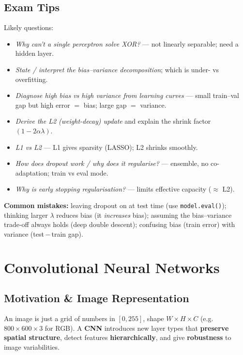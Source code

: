 \documentclass[10pt,a4paper]{article}
\begin{document}
	\subsection{Exam Tips}

	\begin{examtipbox}
		Likely questions:
		\begin{itemize}[leftmargin=*]
			\item \emph{Why can't a single perceptron solve XOR?} --- not linearly separable; need a hidden layer.
			\item \emph{State / interpret the bias--variance decomposition}; which is under- vs overfitting.
			\item \emph{Diagnose high bias vs high variance from learning curves} --- small train--val gap but high error $=$ bias; large gap $=$ variance.
			\item \emph{Derive the L2 (weight-decay) update} and explain the shrink factor $(1-2\alpha\lambda)$.
			\item \emph{L1 vs L2} --- L1 gives sparsity (LASSO); L2 shrinks smoothly.
			\item \emph{How does dropout work / why does it regularise?} --- ensemble, no co-adaptation; train vs eval mode.
			\item \emph{Why is early stopping regularisation?} --- limits effective capacity ($\approx$ L2).
		\end{itemize}
		\textbf{Common mistakes:} leaving dropout on at test time (use \texttt{model.eval()}); thinking larger $\lambda$ reduces bias (it \emph{increases} bias); assuming the bias--variance trade-off always holds (deep double descent); confusing bias (train error) with variance (test\,$-$\,train gap).
	\end{examtipbox}
	
	\section{Convolutional Neural Networks}
	
	\subsection{Motivation \& Image Representation}

	\begin{definitionbox}
		An image is just a grid of numbers in $[0,255]$, shape $W\times H\times C$ (e.g.\ $800\times600\times3$ for RGB). A \textbf{CNN} introduces new layer types that \textbf{preserve spatial structure}, detect features \textbf{hierarchically}, and give \textbf{robustness} to image variabilities.
	\end{definitionbox}
\end{document}
